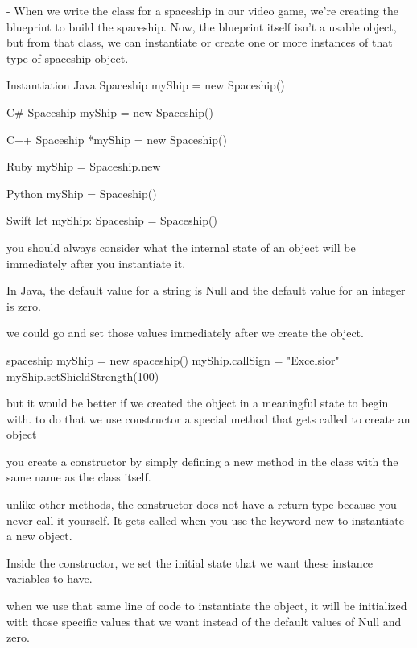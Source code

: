 - When we write the class for a spaceship in our video game, we're creating the blueprint to build the spaceship.
Now, the blueprint itself isn't a usable object, but from that class, we can instantiate or create one or more instances of that type of spaceship object.

Instantiation 
  Java  Spaceship myShip = new Spaceship()

  C#   Spaceship myShip = new Spaceship() 

  C++  Spaceship *myShip = new Spaceship()
  
  Ruby myShip = Spaceship.new

  Python myShip = Spaceship()

  Swift  let myShip: Spaceship = Spaceship()

  you should always consider what the internal state of an object will be immediately after you instantiate it.

  In Java, the default value for a string is Null and the default value for an integer is zero.

  we could go and set those values immediately after we create the object.

  
  spaceship myShip = new spaceship()
  myShip.callSign = "Excelsior"
  myShip.setShieldStrength(100)

  but it would be better if we created the object in a meaningful state to begin with. 
  to do that we use constructor 
    a special method that gets called to create an object 

    you create a constructor by simply defining a new method in the class with the same name as the class itself.

    unlike other methods, the constructor does not have a return type because you never call it yourself. It gets called when you use the keyword new to instantiate a new object. 

    Inside the constructor, we set the initial state that we want these instance variables to have. 

    when we use that same line of code to instantiate the object, it will be initialized with those specific values that we want instead of the default values of Null and zero.

